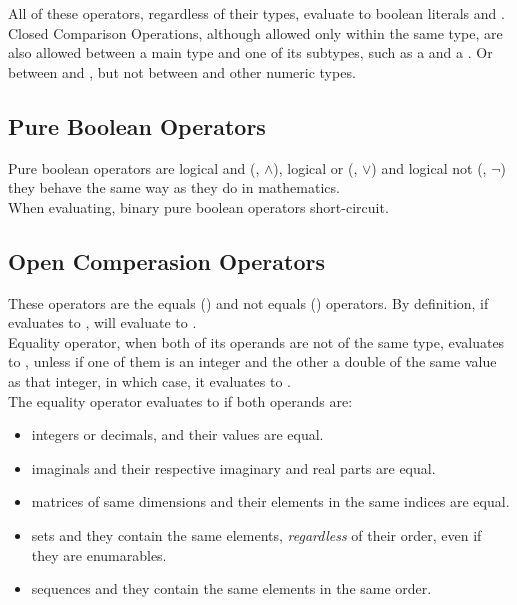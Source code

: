 \documentclass[11pt,a4paper]{book}
\begin{document}
All of these operators, regardless of their types, evaluate to boolean literals  and . Closed Comparison Operations, although allowed only within the same type, are also allowed between a main type and one of its subtypes, such as a  and a . Or between  and , but not between  and other numeric types. \\

\subsection{Pure Boolean Operators}

Pure boolean operators are logical and (\code{\&}, $\land$), logical or (\code{|}, $\lor$) and logical not (\code{\textbackslash}, $\lnot$) they behave the same way as they do in mathematics. \\

When evaluating, binary pure boolean operators short-circuit.

\subsection{Open Comperasion Operators}

These operators are the equals (\code{=}) and not equals (\code{\textbackslash}) operators. By definition, if  evaluates to ,  will evaluate to . \\

Equality operator, when both of its operands are not of the same type, evaluates to , unless if one of them is an integer and the other a double of the same value as that integer, in which case, it evaluates to . \\

The equality operator evaluates to  if both operands are:

\begin{itemize}
\itemsep0em
\item integers or decimals, and their values are equal.
\item imaginals and their respective imaginary and real parts are equal.
\item matrices of same dimensions and their elements in the same indices are equal.
\item sets and they contain the same elements, \textit{regardless} of their order, even if they are enumarables.
\item sequences and they contain the same elements in the same order.
\end{itemize}
\end{document}
